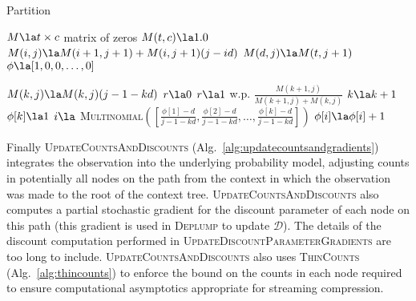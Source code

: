 \begin{algorithm}[t!]
	\caption{Partition} \label{alg:samplepartition}
	\begin{algorithmic}[1]
	
		\State $M \la  t \times c$ matrix of zeros
		\State $M(t,c) \la 1.0$
				\State $M(i,j) \la M(i +1, j+1) + M(i,j+1)(j - id)$ 
			\EndFor
			\State $M(d,j) \la M(t,j+1)$
		\EndFor
		\State $\phi \la [1,0,0,\ldots, 0]$ 
		
			\State $M(k,j) \la M(k,j)(j-1 -k d)$
			\State $r \la 0$
			\State $r \la 1 $ w.p. $\frac{M(k+1,j)}{M(k+1,j) + M(k,j)}$
				\State $k \la k + 1$
				\State $\phi[k]  \la 1$
			\Else
				\State $i \la$ \textsc{Multinomial}$([\frac{\phi[1] - d}{j-1 -kd}, \frac{\phi[2] - d}{j-1 -kd}, \ldots, \frac{\phi[k] - d}{j-1 -kd}])$
				\State $\phi[i] \la \phi[i] + 1$
			\EndIf
		\EndFor
	\EndFunction
		\end{algorithmic}
\end{algorithm}

Finally \textsc{UpdateCountsAndDiscounts} (Alg.~\ref{alg:updatecountsandgradients}) integrates the observation into the underlying probability model, adjusting counts in potentially all nodes on the path from the context in which the observation was made to the root of the context tree.   \textsc{UpdateCountsAndDiscounts} also computes a partial stochastic gradient for the discount parameter of each node on this path (this gradient is used in \textsc{Deplump} to update $\mathcal{D}$).  The details of the discount computation performed in \textsc{UpdateDiscountParameterGradients} are too long to include.  \textsc{UpdateCountsAndDiscounts} also uses \textsc{ThinCounts} (Alg.~\ref{alg:thincounts}) to enforce the bound on the counts in each node required to ensure computational asymptotics appropriate for streaming compression. 



